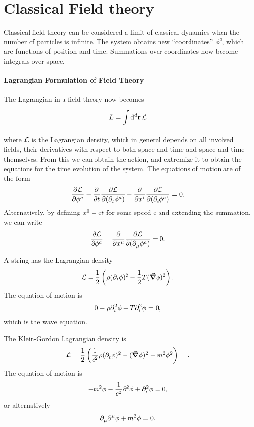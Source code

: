 \section{Classical Field theory}

Classical field theory can be considered a limit of classical dynamics when the number of particles is infinite. The system obtains new ``coordinates'' $\phi^{a}$, which are functions of position and time. Summations over coordinates now become integrals over space.

\paragraph{Lagrangian Formulation of Field Theory}
The Lagrangian in a field theory now becomes
\begin{align*}
	L = \int\limits_{}^{}\dd[d]{\vb{r}}\mathcal{L}
\end{align*}
where $\mathcal{L}$ is the Lagrangian density, which in general depends on all involved fields, their derivatives with respect to both space and time and space and time themselves. From this we can obtain the action, and extremize it to obtain the equations for the time evolution of the system. The equations of motion are of the form
\begin{align*}
	\pdv{\ensuremath{\mathcal{L}}}{\phi^{a}} - \pdv{t}\pdv{\ensuremath{\mathcal{L}}}{(\ensuremath{\partial^{}_{t}}{\phi^{a}})} - \pdv{x^{i}}\pdv{\ensuremath{\mathcal{L}}}{(\ensuremath{\partial^{}_{i}}{\phi^{a}})} = 0.
\end{align*}
Alternatively, by defining $x^{0} = ct$ for some speed $c$ and extending the summation, we can write
\begin{align*}
	\pdv{\ensuremath{\mathcal{L}}}{\phi^{a}} - \pdv{x^{\mu}}\pdv{\ensuremath{\mathcal{L}}}{(\ensuremath{\partial^{}_{\mu}}{\phi^{a}})} = 0.
\end{align*}

A string has the Lagrangian density
\begin{align*}
	\mathcal{L} = \frac{1}{2}\left(\rho(\partial^{}_{t}{\phi})^{2} - \frac{1}{2}T(\grad{\phi})^{2}\right).
\end{align*}
The equation of motion is
\begin{align*}
	0 - \rho\partial^{2}_{t}{\phi} + T\partial^{2}_{i}{\phi} = 0,
\end{align*}
which is the wave equation.

The Klein-Gordon Lagrangian density is
\begin{align*}
	\mathcal{L} = \frac{1}{2}\left(\frac{1}{c^{2}}\rho(\partial^{}_{t}{\phi})^{2} - (\grad{\phi})^{2} - m^{2}\phi^{2}\right) = .
\end{align*}
The equation of motion is
\begin{align*}
	-m^{2}\phi - \frac{1}{c^{2}}\partial^{2}_{t}{\phi} + \partial^{2}_{i}{\phi} = 0,
\end{align*}
or alternatively
\begin{align*}
	\partial^{}_{\mu}{\partial^{\mu}_{}{\phi}} + m^{2}\phi = 0.
\end{align*}

